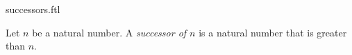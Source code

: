 \documentclass{stex}
\begin{document}
\begin{smodule}{successors.ftl}


\begin{definition}[forthel,id=SuccessorDef]
  Let $n$ be a natural number.
  A \emph{successor of $n$} is a natural number that is greater than $n$.
\end{definition}

\end{smodule}
\end{document}
